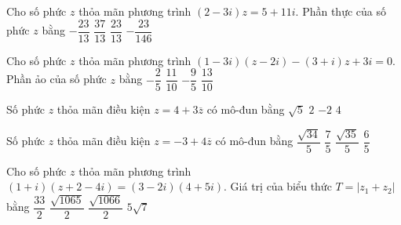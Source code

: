 \begin{ex}%
Cho số phức $z$ thỏa mãn phương trình $(2-3i)z=5+11i$. Phần thực của số phức $z$ bằng
\choice
{\True $-\dfrac{23}{13}$}
{$\dfrac{37}{13}$}
{$\dfrac{23}{13}$}
{$-\dfrac{23}{146}$}
\end{ex}

\begin{ex}%
Cho số phức $z$ thỏa mãn phương trình $(1-3i)(z-2i)-(3+i)z+3i=0$. Phần ảo của số phức $z$ bằng
\choice
{$-\dfrac{2}{5}$}
{$\dfrac{11}{10}$}
{$-\dfrac{9}{5}$}
{\True $\dfrac{13}{10}$}
\end{ex}

\begin{ex}%
Số phức $z$ thỏa mãn điều kiện $z=4+3\overline{z}$ có mô-đun bằng
\choice
{\True $\sqrt{5}$}
{$2$}
{$-2$}
{$4$}
\end{ex}

\begin{ex}%
Số phức $z$ thỏa mãn điều kiện $z=-3+4\overline{z}$ có mô-đun bằng
\choice
{\True $\dfrac{\sqrt{34}}{5}$}
{$\dfrac{7}{5}$}
{$\dfrac{\sqrt{35}}{5}$}
{$\dfrac{6}{5}$}
\end{ex}

\begin{ex}%
Cho số phức $z$ thỏa mãn phương trình $(1+i)(z+2-4i)=(3-2i)(4+5i)$. Giá trị của biểu thức $T=\left|z_1+z_2\right|$ bằng
\choice
{$\dfrac{33}{2}$}
{$\dfrac{\sqrt{1065}}{2}$}
{\True $\dfrac{\sqrt{1066}}{2}$}
{$5\sqrt{7}$}
\end{ex}


